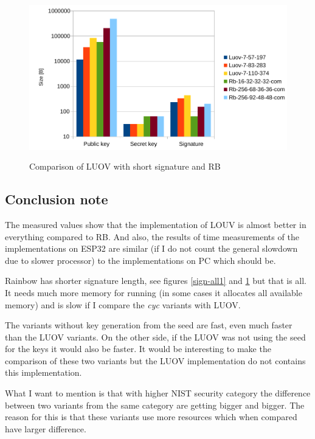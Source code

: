 \documentclass[thesis=M,english]{FITthesis}[2019/12/23]
\begin{document}
\bigskip\bigskip\bigskip
\begin{figure}[H]
\centering
\includegraphics[width=13cm,height=7cm]{images/mem-sign-all2.pdf}
\caption{Comparison of LUOV with short signature and RB}
\label{sign-all2}
\end{figure}

\newpage
\subsection{Conclusion note}
The measured values show that the implementation of LOUV is almost better in everything compared to RB. And also, the results of time measurements of the implementations on ESP32 are similar (if I do not count the general slowdown due to slower processor) to the implementations on PC which should be.

\bigskip
\noindent
Rainbow has shorter signature length, see figures \ref{sign-all1} and \ref{sign-all2} but that is all. It needs much more memory for running (in some cases it allocates all available memory) and is slow if I compare the \textit{cyc} variants with LUOV.

\bigskip
\noindent
The variants without key generation from the seed are fast, even much faster than the LUOV variants. On the other side, if the LUOV was not using the seed for the keys it would also be faster. It would be interesting to make the comparison of these two variants but the LUOV implementation do not contains this implementation.

\bigskip
\noindent
What I want to mention is that with higher NIST security category the difference between two variants from the same category are getting bigger and bigger. The reason for this is that these variants use more resources which when compared have larger difference. 

\newpage
\end{document}
